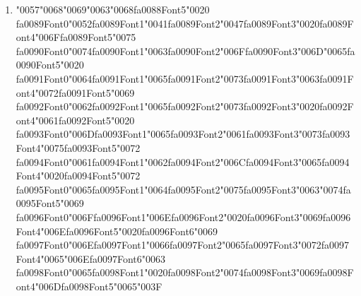 \documentclass[12pt]{article}
\begin{document}
\begin{enumerate}[label=Q\arabic*.]
\item {\char"0057}{\char"0068}{\char"0069}{\char"0063}{\char"0068}{\csname fa0088Font5\endcsname\char"0020} {\csname fa0089Font0\endcsname\char"0052}{\csname fa0089Font1\endcsname\char"0041}{\csname fa0089Font2\endcsname\char"0047}{\csname fa0089Font3\endcsname\char"0020}{\csname fa0089Font4\endcsname\char"006F}{\csname fa0089Font5\endcsname\char"0075} {\csname fa0090Font0\endcsname\char"0074}{\csname fa0090Font1\endcsname\char"0063}{\csname fa0090Font2\endcsname\char"006F}{\csname fa0090Font3\endcsname\char"006D}{\char"0065}{\csname fa0090Font5\endcsname\char"0020} {\csname fa0091Font0\endcsname\char"0064}{\csname fa0091Font1\endcsname\char"0065}{\csname fa0091Font2\endcsname\char"0073}{\csname fa0091Font3\endcsname\char"0063}{\csname fa0091Font4\endcsname\char"0072}{\csname fa0091Font5\endcsname\char"0069} {\csname fa0092Font0\endcsname\char"0062}{\csname fa0092Font1\endcsname\char"0065}{\csname fa0092Font2\endcsname\char"0073}{\csname fa0092Font3\endcsname\char"0020}{\csname fa0092Font4\endcsname\char"0061}{\csname fa0092Font5\endcsname\char"0020} {\csname fa0093Font0\endcsname\char"006D}{\csname fa0093Font1\endcsname\char"0065}{\csname fa0093Font2\endcsname\char"0061}{\csname fa0093Font3\endcsname\char"0073}{\csname fa0093Font4\endcsname\char"0075}{\csname fa0093Font5\endcsname\char"0072} {\csname fa0094Font0\endcsname\char"0061}{\csname fa0094Font1\endcsname\char"0062}{\csname fa0094Font2\endcsname\char"006C}{\csname fa0094Font3\endcsname\char"0065}{\csname fa0094Font4\endcsname\char"0020}{\csname fa0094Font5\endcsname\char"0072} {\csname fa0095Font0\endcsname\char"0065}{\csname fa0095Font1\endcsname\char"0064}{\csname fa0095Font2\endcsname\char"0075}{\csname fa0095Font3\endcsname\char"0063}{\char"0074}{\csname fa0095Font5\endcsname\char"0069} {\csname fa0096Font0\endcsname\char"006F}{\csname fa0096Font1\endcsname\char"006E}{\csname fa0096Font2\endcsname\char"0020}{\csname fa0096Font3\endcsname\char"0069}{\csname fa0096Font4\endcsname\char"006E}{\csname fa0096Font5\endcsname\char"0020}{\csname fa0096Font6\endcsname\char"0069} {\csname fa0097Font0\endcsname\char"006E}{\csname fa0097Font1\endcsname\char"0066}{\csname fa0097Font2\endcsname\char"0065}{\csname fa0097Font3\endcsname\char"0072}{\csname fa0097Font4\endcsname\char"0065}{\char"006E}{\csname fa0097Font6\endcsname\char"0063} {\csname fa0098Font0\endcsname\char"0065}{\csname fa0098Font1\endcsname\char"0020}{\csname fa0098Font2\endcsname\char"0074}{\csname fa0098Font3\endcsname\char"0069}{\csname fa0098Font4\endcsname\char"006D}{\csname fa0098Font5\endcsname\char"0065}{\char"003F}

\end{enumerate}
\end{document}
